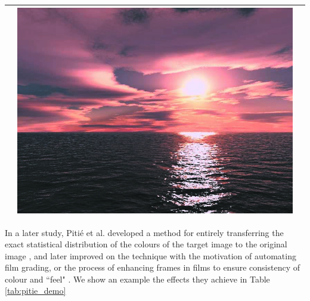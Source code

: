 \begin{table}[H]
\begin{tabular}{|c|c|c|}
\begin{minipage}{.29\textwidth}
  \end{minipage} & 
  \begin{minipage}{.29\textwidth}
    \includegraphics[width=\textwidth,height=\textheight,keepaspectratio]{images/reinhard_result1}
  \end{minipage} \\
    \hline
\end{tabular}
\end{table}

In a later study, Piti\'{e} et al. developed a method for entirely transferring the exact statistical distribution of the colours of the target image to the original image \cite{pitie_2005_pdf}, and later improved on the technique with the motivation of automating film grading, or the process of enhancing frames in films to ensure consistency of colour and ``feel" \cite{pitie_2007_grading}. We show an example the effects they achieve in Table \ref{tab:pitie_demo}

